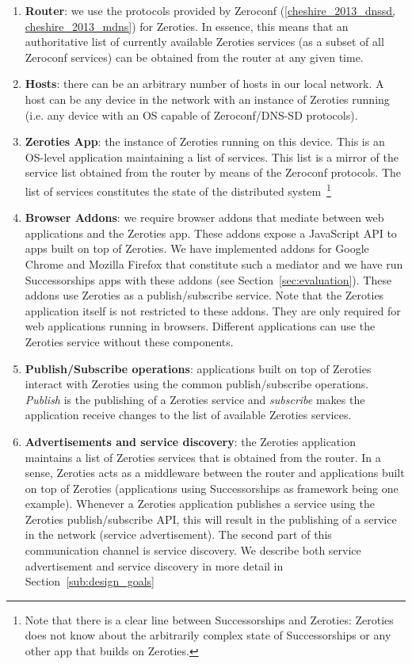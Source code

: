 \begin{enumerate}
\item \textbf{Router}: we use the protocols provided by Zeroconf (\ref{cheshire_2013_dnssd, cheshire_2013_mdns}) for Zeroties. 
In essence, this means that an authoritative list of currently available Zeroties services (as a subset of all Zeroconf services) can be obtained from the router at any given time.

\item \textbf{Hosts}: there can be an arbitrary number of hosts in our local network. A host can be any device in the network with an instance of Zeroties running (i.e. any device with an OS capable of Zeroconf/DNS-SD protocols).

\item \textbf{Zeroties App}: the instance of Zeroties running on this device. 
This is an OS-level application maintaining a list of services.
This list is a mirror of the service list obtained from the router by means of the Zeroconf protocols. 
The list of services constitutes the state of the distributed system~\footnote{Note that there is a clear line between Successorships and Zeroties: Zeroties does not know about the arbitrarily complex state of Successorships or any other app that builds on Zeroties.}

\item \textbf{Browser Addons}: we require browser addons that mediate between web applications and the Zeroties app. These addons expose a JavaScript API to apps built on top of Zeroties.
We have implemented addons for Google Chrome and Mozilla Firefox that constitute such a mediator and we have run Successorships apps with these addons (see Section~\ref{sec:evaluation}).
These addons use Zeroties as a publish/subscribe service.
Note that the Zeroties application itself is not restricted to these addons.
They are only required for web applications running in browsers.
Different applications can use the Zeroties service without these components.

\item \textbf{Publish/Subscribe operations}: applications built on top of Zeroties interact with Zeroties using the common publish/subscribe operations.
\textit{Publish} is the publishing of a Zeroties service and \textit{subscribe} makes the application receive changes to the list of available Zeroties services. 

\item \textbf{Advertisements and service discovery}: the Zeroties application maintains a list of Zeroties services that is obtained from the router.
In a sense, Zeroties acts as a middleware between the router and applications built on top of Zeroties (applications using Successorships as framework being one example). 
Whenever a Zeroties application publishes a service using the Zeroties publish/subscribe API, this will result in the publishing of a service in the network (service advertisement). 
The second part of this communication channel is service discovery.
We describe both service advertisement and service discovery in more detail in Section~\ref{sub:design_goals}
\end{enumerate}


